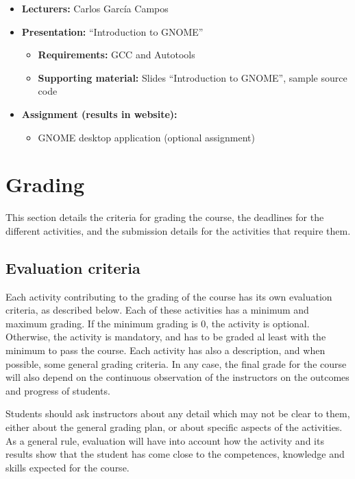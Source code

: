 \documentclass[a4paper]{article}
\begin{document}
\begin{itemize}
\item \textbf{Lecturers:} Carlos Garc\'ia Campos
\item \textbf{Presentation:} ``Introduction to GNOME''
  \begin{itemize}
  \item \textbf{Requirements:} GCC and Autotools
  \item \textbf{Supporting material:} Slides ``Introduction to
    GNOME'', sample source code 
  \end{itemize}
\item \textbf{Assignment (results in website):} 
  \begin{itemize}
  \item GNOME desktop application (optional assignment)
  \end{itemize}
\end{itemize}


\section{Grading}

This section details the criteria for grading the course, the
deadlines for the different activities, and the submission details for
the activities that require them.

\subsection{Evaluation criteria}
\label{sub:evaluation-criteria}

Each activity contributing to the grading of the course has its own
evaluation criteria, as described below. Each of these activities has
a minimum and maximum grading. If the minimum grading is 0, the
activity is optional. Otherwise, the activity is mandatory, and has to
be graded al least with the minimum to pass the course. Each activity
has also a description, and when possible, some general grading
criteria. In any case, the final grade for the course will also depend
on the continuous observation of the instructors on the outcomes and
progress of students.

Students should ask instructors about any detail which may not be
clear to them, either about the general grading plan, or about
specific aspects of the activities. As a general rule, evaluation will
have into account how the activity and its results show that the
student has come close to the competences, knowledge and skills
expected for the course.
\end{document}
